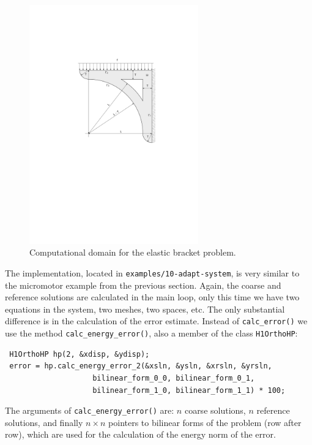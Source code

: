 \begin{figure}[ht]
  \medskip \centering
  \includegraphics[width=0.65\textwidth]{img/bracket}
  \vspace{-2mm}
  \caption{Computational domain for the elastic bracket problem.}
  \label{fig:bracket}
\end{figure}

The implementation, located in {\tt examples/10-adapt-system}, is very similar to the micromotor
example from the previous section. Again, the coarse and reference solutions are calculated
in the main loop, only this time we have two equations in the system, two meshes, two spaces, etc.
The only substantial difference is in the calculation of the error estimate. Instead of
\verb"calc_error()" we use the method \verb"calc_energy_error()", also a member of the
class \verb"H1OrthoHP":

\begin{lstlisting}
 H1OrthoHP hp(2, &xdisp, &ydisp);
 error = hp.calc_energy_error_2(&xsln, &ysln, &xrsln, &yrsln,
                    bilinear_form_0_0, bilinear_form_0_1,
                    bilinear_form_1_0, bilinear_form_1_1) * 100;
\end{lstlisting}

The arguments of \verb"calc_energy_error()" are: $n$ coarse solutions, $n$ reference solutions,
and finally $n \times n$ pointers to bilinear forms of the problem (row after row), which are used
for the calculation of the energy norm of the error.

